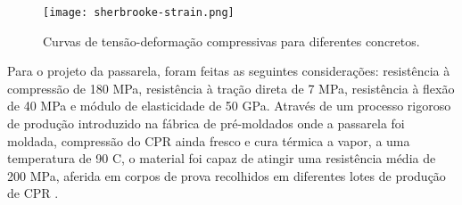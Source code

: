 \begin{table}[htb]
\end{table}

\begin{figure}[htb]
	\caption{\label{sherbrooke_curva} Curvas de tensão-deformação compressivas para diferentes concretos.}
	\begin{center}
	    \texttt{[image: sherbrooke-strain.png]}
	\end{center}
\end{figure}

Para o projeto da passarela, foram feitas as seguintes considerações: resistência à compressão de 180 MPa, resistência à tração direta de 7 MPa, resistência à flexão de 40 MPa e módulo de elasticidade de 50 GPa. Através de um processo rigoroso de produção introduzido na fábrica de pré-moldados onde a passarela foi moldada, compressão do CPR ainda fresco e cura térmica a vapor, a uma temperatura de 90\textsuperscript{\degree} C, o material foi capaz de atingir uma resistência média de 200 MPa, aferida em corpos de prova recolhidos em diferentes lotes de produção de CPR \cite[p.~141]{Aitcin_sher}.

